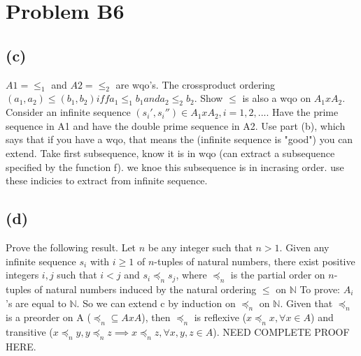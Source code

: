 \documentclass[12pt]{article}
\begin{document}
\section*{Problem B6}

\subsection*{(c)}
$ A1 = \le_1$ and $A2 = \le_2$ are wqo's.
The crossproduct ordering $(a_1,a_2) \le (b_1, b_2)
iff a_1 \le_1 b_1 and a_2 \le_2 b_2$.
Show $\le$ is also a wqo on $A_1 x A_2$.
Consider an infinite sequence $(s_i ' , s_i '') \in A_1 x A_2, i = 1,2,...$.
Have the prime sequence in A1 and have the double prime sequence in A2.
Use part (b), which says that if you have a wqo, that means the
(infinite sequence is "good") you can extend. Take first subsequence,
know it is in wqo (can extract a subsequence specified by the function f).
we knoe this subsequence is in incrasing order. use these indicies to extract
from infinite sequence.

\subsection*{(d)}
Prove the following result.
\newline
Let $n$ be any  integer such that $n>1$.
Given any infinite sequence $s_i$ with $i \ge 1$ of $n$-tuples of
natural numbers, there exist positive integers $i, j$ such that
$i<j$ and $s_{i}\preceq_{n} s_{j}$, where $\preceq_{n}$ is the
partial order on $n$-tuples of natural numbers
induced by the natural ordering $\le$ on $\mathbb{N}$
To prove: $A_i$'s are equal to $\mathbb{N}$.
So we can extend c by induction on $\preceq_{n}$ on $\mathbb{N}$.
Given that $\preceq_{n}$ is a preorder on A ($\preceq_{n} \subseteq AxA$),
then $\preceq_{n}$ is reflexive ($ x \preceq_{n} x,\forall x \in A$)
and transitive ($x \preceq_{n} y, y \preceq_{n} z \implies x \preceq_{n} z,
\forall x,y,z \in A$). NEED COMPLETE PROOF HERE.
\end{document}
